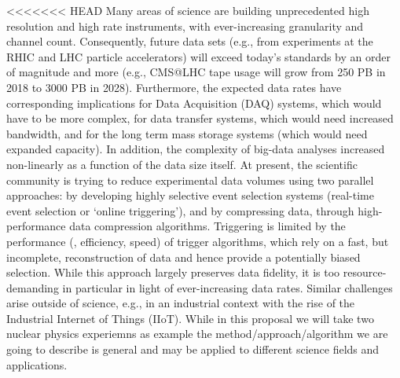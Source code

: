 <<<<<<< HEAD
Many areas of science are building unprecedented high resolution and high rate instruments, with ever-increasing granularity and channel count. Consequently,  future data sets  (e.g., from experiments at the RHIC and LHC particle accelerators) will exceed today's standards by an order of magnitude and more (e.g., CMS@LHC tape usage will grow from 250 PB in 2018 to 3000 PB in 2028). Furthermore, the expected data rates have corresponding implications for  Data Acquisition (DAQ) systems, which would have to be more complex, for data transfer systems, which would need increased bandwidth, and for the long term mass storage systems (which would need expanded capacity). In addition, the complexity of big-data analyses increased non-linearly as a function of the data size itself. At present, the scientific community is trying to reduce experimental data volumes using two parallel approaches: by developing highly selective event selection systems (\eg real-time event selection or `online triggering'), and by compressing data, through high-performance data compression algorithms. Triggering is limited by the performance (\ie, efficiency, speed) of trigger algorithms, which rely on a fast, but incomplete, reconstruction of data and hence provide a potentially biased selection. While this approach largely preserves data fidelity, it is too resource-demanding in particular in light of ever-increasing data rates. Similar challenges arise outside of science, e.g., in an industrial context with the rise of the Industrial Internet of Things (IIoT). While in this proposal we will take two nuclear physics experiemns as example the method/approach/algorithm we are going to describe is general and may be applied to different science fields and applications. 


